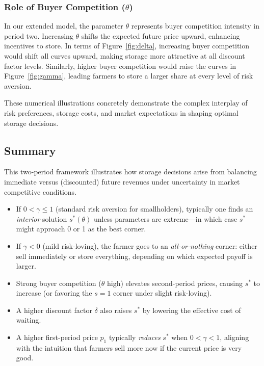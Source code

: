 \documentclass[12pt]{article}
\begin{document}
\subsubsection{Role of Buyer Competition ($\theta$)}

In our extended model, the parameter $\theta$ represents buyer competition intensity in period two. Increasing $\theta$ shifts the expected future price upward, enhancing incentives to store. In terms of Figure~\ref{fig:delta}, increasing buyer competition would shift all curves upward, making storage more attractive at all discount factor levels. Similarly, higher buyer competition would raise the curves in Figure~\ref{fig:gamma}, leading farmers to store a larger share at every level of risk aversion.

These numerical illustrations concretely demonstrate the complex interplay of risk preferences, storage costs, and market expectations in shaping optimal storage decisions.



\subsection{Summary}

This two-period framework illustrates how storage decisions arise from balancing immediate versus (discounted) future revenues under uncertainty in market competitive conditions.  
\begin{itemize}
    \item If $0<\gamma\le1$ (standard risk aversion for smallholders), typically one finds an \emph{interior} solution $s^*(\theta)$ unless parameters are extreme---in which case $s^*$ might approach 0 or 1 as the best corner. 
    \item If $\gamma<0$ (mild risk-loving), the farmer goes to an \emph{all-or-nothing} corner: either sell immediately or store everything, depending on which expected payoff is larger.
    \item Strong buyer competition ($\theta$ high) elevates second-period prices, causing $s^*$ to increase (or favoring the $s=1$ corner under slight risk-loving). 
    \item A higher discount factor $\delta$ also raises $s^*$ by lowering the effective cost of waiting.
    \item A higher first-period price $p_1$ typically \emph{reduces} $s^*$ when $0<\gamma<1$, aligning with the intuition that farmers sell more now if the current price is very good.
\end{itemize}
\end{document}
